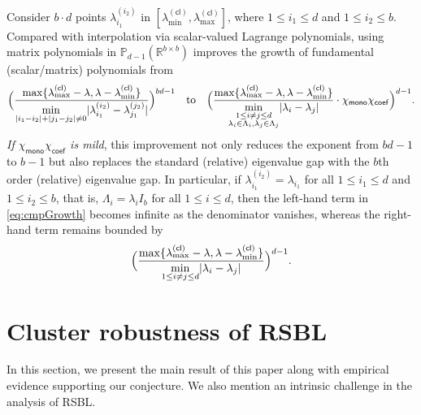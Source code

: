 \documentclass{article}
\newcommand{\poly}{\mathbb{P}}
\newcommand{\chim}{\chi_{\mathsf{mono}}}
\newcommand{\chic}{\chi_{\mathsf{coef}}}
\newcommand{\cl}{(\mathsf{cl})}
\newcommand{\R}{\mathbb{R}}
\providecommand{\abs}[1]{\lvert#1\rvert}
\begin{document}
  
Consider $b\cdot d$ points $\lambda_{i_{1}}^{(i_{2})}$ in $[\lambda_{\min}^{\cl},\lambda_{\max}^{\cl}]$, where $1\leq i_{1}\leq d$ and $1\leq i_{2}\leq b$.
Compared with interpolation via scalar-valued Lagrange polynomials, using matrix polynomials in $\poly_{d-1}(\R^{b\times b})$ improves the growth of fundamental (scalar/matrix) polynomials from 
\begin{equation}
    \label{eq:cmpGrowth}
    \Bigl(\frac{\max\{\lambda_{\max}^{\cl}-\lambda,\lambda-\lambda_{\min}^{\cl}\}}{\min\limits_{\substack{ \abs{i_{1}-i_{2}}+\abs{j_{1}-j_{2}}\neq 0}} \abs{\lambda_{i_{1}}^{(i_{2})}-\lambda_{j_{1}}^{(j_{2})}}}\Bigr)^{bd-1} 
    \quad\text{to}\quad
    \Bigl(\frac{\max\{\lambda_{\max}^{\cl}-\lambda,\lambda-\lambda_{\min}^{\cl}\}}{\min\limits_{\substack{1\leq i\neq j\leq d\\ \lambda_{i}\in \Lambda_{i}, \lambda_{j}\in \Lambda_{j}}} \abs{\lambda_{i}-\lambda_{j}}} \cdot \chim \chic\Bigr)^{d-1}.
\end{equation}
\emph{If $\chim \chic$ is mild}, this improvement not only reduces the exponent from $bd-1$ to $b-1$ but also replaces the standard (relative) eigenvalue gap with the $b$th order (relative) eigenvalue gap. 
In particular, if $\lambda_{i_{1}}^{(i_{2})}=\lambda_{i_{1}}$ for all $1\leq i_{1}\leq d$ and $1\leq i_{2}\leq b$, that is, $\Lambda_{i}=\lambda_{i} I_{b}$ for all $1\leq i\leq d$, then the left-hand term in \cref{eq:cmpGrowth} becomes infinite as the denominator vanishes, whereas the right-hand term remains bounded by
\begin{equation*}
    \Bigl(\frac{\max\{\lambda_{\max}^{\cl}-\lambda,\lambda-\lambda_{\min}^{\cl}\}}{\min\limits_{1\leq i\neq j\leq d} \abs{\lambda_{i}-\lambda_{j}}} \Bigr)^{d-1}.
\end{equation*}






\section{Cluster robustness of RSBL}

In this section, we present the main result of this paper along with empirical evidence supporting our conjecture. We also mention an intrinsic challenge in the analysis of RSBL.
\end{document}
